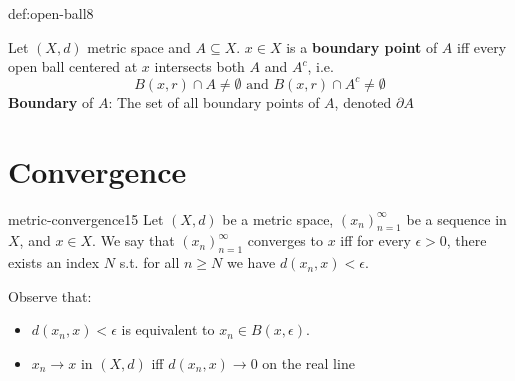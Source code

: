 \documentclass[landscape, 8pt]{extarticle}
\begin{document}
\begin{multicols}{3}
\begin{dfn}{def:open-ball}{8}
    \vspace{-3pt}
    \vspace{-3pt}

    Let $(X, d)$ metric space and $A \subseteq X$. $x\in X$ is a \textbf{boundary point} of $A$ iff every open ball centered at $x$ intersects both $A$ and $A^{c}$, i.e.
    \[B(x,r) \cap A \ne \emptyset \text{ and } B(x, r) \cap A^{c} \ne \emptyset\]
    \textbf{Boundary} of $A$: The set of all boundary points of $A$, denoted $\partial A$

\end{dfn}


%
%
%
%

\section{Convergence}


\begin{dfn}{metric-convergence}{15}
    Let $(X,d)$ be a metric space, $(x_{n})^{\infty}_{n=1}$ be a sequence in $X$, and $x\in X$. We say that $(x_{n})^{\infty}_{n=1}$ converges to $x$ iff for every $\epsilon > 0$, there exists an index $N$ s.t. for all $n\ge N$ we have $d(x_{n}, x) < \epsilon$.

    Observe that:
    \vspace{-5pt}
    \begin{itemize}
        \item $d(x_{n}, x)< \epsilon$ is equivalent to $x_{n}\in B(x,\epsilon)$.
        \item $x_{n}\to x$ in $(X,d)$ iff $d(x_{n}, x)\to 0$ on the real line
    \end{itemize}
\end{dfn}


\end{multicols}
\end{document}
